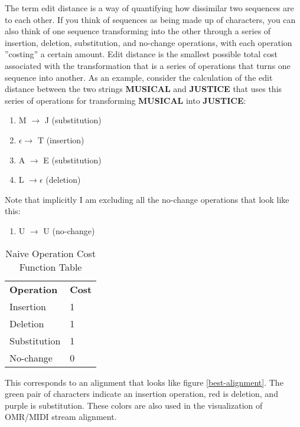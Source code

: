 The term edit distance is a way of quantifying how dissimilar two sequences are to each other. If you think of sequences as being made up of characters, you can also think of one sequence transforming into the other through a series of insertion, deletion, substitution, and no-change operations, with each operation ''costing'' a certain amount. Edit distance is the smallest possible total cost associated with the transformation that is a series of operations that turns one sequence into another. As an example, consider the calculation of the edit distance between the two strings \textbf{MUSICAL} and \textbf{JUSTICE} that uses this series of operations for transforming \textbf{MUSICAL} into \textbf{JUSTICE}:

\begin{enumerate}
\item M $\rightarrow$  J (substitution)
\item $\epsilon \rightarrow$  T (insertion)
\item A $\rightarrow$  E (substitution)
\item L $\rightarrow  \epsilon$ (deletion)
\end{enumerate}


Note that implicitly I am excluding all the no-change operations that look like this:
\begin{enumerate}
\item U $\rightarrow$  U (no-change)
\end{enumerate}

\begin{table}[!h]
\centering
\begin{tabular}{ll}
\textbf{Operation} & \textbf{Cost} \\
Insertion          & 1             \\
Deletion           & 1             \\
Substitution       & 1             \\
No-change          & 0            
\end{tabular}
\caption{Naive Operation Cost Function Table}
\label{tab:naivetable}
\end{table}
	
This corresponds to an alignment that looks like figure \ref{best-alignment}. The green pair of characters indicate an insertion operation, red is deletion, and purple is substitution. These colors are also used in the visualization of OMR/MIDI stream alignment. 

